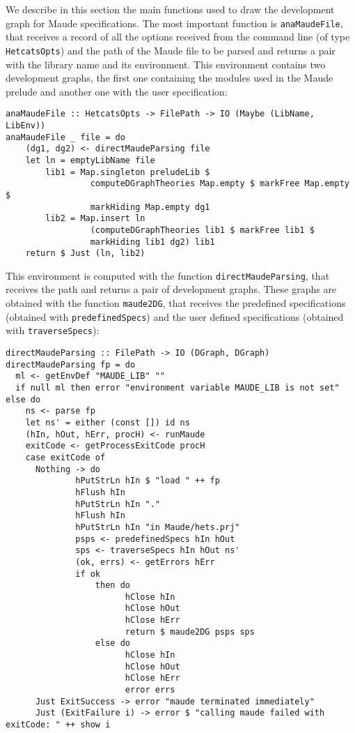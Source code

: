 
We describe in this section the main functions used to draw the
development graph for Maude specifications. The most important function is
\verb"anaMaudeFile", that receives a record of all the options received
from the command line (of type \verb"HetcatsOpts") and the path of
the Maude file to be parsed and returns a pair with the library
name and its environment. This environment contains two development
graphs, the first one containing the modules used in the Maude prelude
and another one with the user specification:

{\codesize
\begin{verbatim}
anaMaudeFile :: HetcatsOpts -> FilePath -> IO (Maybe (LibName, LibEnv))
anaMaudeFile _ file = do
    (dg1, dg2) <- directMaudeParsing file
    let ln = emptyLibName file
        lib1 = Map.singleton preludeLib $
                 computeDGraphTheories Map.empty $ markFree Map.empty $
                 markHiding Map.empty dg1
        lib2 = Map.insert ln
                 (computeDGraphTheories lib1 $ markFree lib1 $
                 markHiding lib1 dg2) lib1
    return $ Just (ln, lib2)
\end{verbatim}
}

This environment is computed with the function
\verb"directMaudeParsing", that receives the path and returns
a pair of development graphs.
These graphs are obtained with the function \verb"maude2DG", that receives
the predefined specifications (obtained with \verb"predefinedSpecs")
and the user defined specifications (obtained with \verb"traverseSpecs"):

{\codesize
\begin{verbatim}
directMaudeParsing :: FilePath -> IO (DGraph, DGraph)
directMaudeParsing fp = do
  ml <- getEnvDef "MAUDE_LIB" ""
  if null ml then error "environment variable MAUDE_LIB is not set" else do
    ns <- parse fp
    let ns' = either (const []) id ns
    (hIn, hOut, hErr, procH) <- runMaude
    exitCode <- getProcessExitCode procH
    case exitCode of
      Nothing -> do
              hPutStrLn hIn $ "load " ++ fp
              hFlush hIn
              hPutStrLn hIn "."
              hFlush hIn
              hPutStrLn hIn "in Maude/hets.prj"
              psps <- predefinedSpecs hIn hOut
              sps <- traverseSpecs hIn hOut ns'
              (ok, errs) <- getErrors hErr
              if ok
                  then do
                        hClose hIn
                        hClose hOut
                        hClose hErr
                        return $ maude2DG psps sps
                  else do
                        hClose hIn
                        hClose hOut
                        hClose hErr
                        error errs
      Just ExitSuccess -> error "maude terminated immediately"
      Just (ExitFailure i) -> error $ "calling maude failed with exitCode: " ++ show i
\end{verbatim}
}

